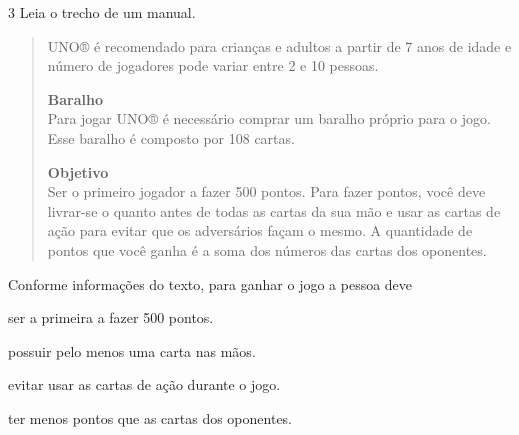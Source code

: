 \num{3} Leia o trecho de um manual.

\begin{quote}
UNO® é recomendado para crianças e adultos a partir de 7 anos de idade e número de jogadores pode variar entre 2 e 10 pessoas.

\textbf{Baralho}\\
Para jogar UNO® é necessário comprar um baralho próprio para o jogo. Esse baralho é composto por 108 cartas.

\textbf{Objetivo}\\
Ser o primeiro jogador a fazer 500 pontos. Para fazer pontos, você deve
livrar-se o quanto antes de todas as cartas da sua mão e usar as cartas 
de ação para evitar que os adversários façam o mesmo. A quantidade de 
pontos que você ganha é a soma dos números das cartas dos oponentes.
\end{quote}


Conforme informações do texto, para ganhar o jogo a pessoa deve

\begin{escolha}
\item ser a primeira a fazer 500 pontos.

\item possuir pelo menos uma carta nas mãos.

\item evitar usar as cartas de ação durante o jogo.

\item ter menos pontos que as cartas dos oponentes.
\end{escolha}

